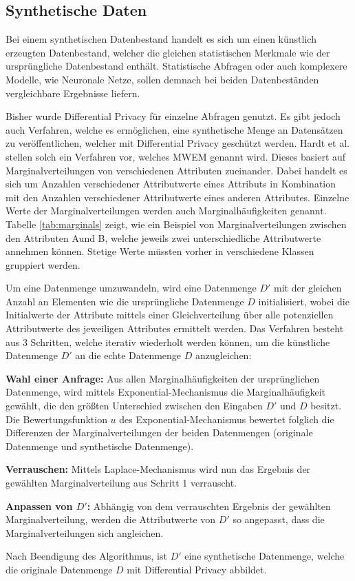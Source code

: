 \subsection{Synthetische Daten}\label{sec:synthetic_data}

Bei einem synthetischen Datenbestand handelt es sich um einen künstlich erzeugten Datenbestand, welcher die gleichen statistischen Merkmale wie der ursprüngliche Datenbestand enthält.
Statistische Abfragen oder auch komplexere Modelle, wie Neuronale Netze, sollen demnach bei beiden Datenbeständen vergleichbare Ergebnisse liefern.

Bisher wurde Differential Privacy für einzelne Abfragen genutzt.
Es gibt jedoch auch Verfahren, welche es ermöglichen, eine synthetische Menge an Datensätzen zu veröffentlichen, welcher mit Differential Privacy geschützt werden.
Hardt et al. \cite{P-90} stellen solch ein Verfahren vor, welches MWEM genannt wird.
Dieses basiert auf Marginalverteilungen von verschiedenen Attributen zueinander.
Dabei handelt es sich um Anzahlen verschiedener Attributwerte eines Attributs in Kombination mit den Anzahlen verschiedener Attributwerte eines anderen Attributes.
Einzelne Werte der Marginalverteilungen werden auch Marginalhäufigkeiten genannt.
Tabelle \ref{tab:marginals} zeigt, wie ein Beispiel von Marginalverteilungen zwischen den Attributen \dq A\dq und \dq B\dq, welche jeweils zwei unterschiedliche Attributwerte annehmen können.
Stetige Werte müssten vorher in verschiedene Klassen gruppiert werden.



Um eine Datenmenge umzuwandeln, wird eine Datenmenge $D'$ mit der gleichen Anzahl an Elementen wie die ursprüngliche Datenmenge $D$ initialisiert, wobei die Initialwerte der Attribute mittels einer Gleichverteilung über alle potenziellen Attributwerte des jeweiligen Attributes ermittelt werden.
Das Verfahren besteht aus 3 Schritten, welche iterativ wiederholt werden können, um die künstliche Datenmenge $D'$ an die echte Datenmenge $D$ anzugleichen:
\begin{compactenum}
    \item \textbf{Wahl einer Anfrage:} Aus allen Marginalhäufigkeiten der ursprünglichen Datenmenge, wird mittels Exponential-Mechanismus die Marginalhäufigkeit gewählt, die den größten Unterschied zwischen den Eingaben $D'$ und $D$ besitzt.
    Die Bewertungsfunktion $u$ des Exponential-Mechanismus bewertet folglich die Differenzen der Marginalverteilungen der beiden Datenmengen (originale Datenmenge und synthetische Datenmenge).
    \item \textbf{Verrauschen:} Mittels Laplace-Mechanismus wird nun das Ergebnis der gewählten Marginalverteilung aus Schritt 1 verrauscht.
    \item \textbf{Anpassen von $D'$:} Abhängig von dem verrauschten Ergebnis der gewählten Marginalverteilung, werden die Attributwerte von $D'$ so angepasst, dass die Marginalverteilungen sich angleichen.
\end{compactenum}
Nach Beendigung des Algorithmus, ist $D'$ eine synthetische Datenmenge, welche die originale Datenmenge $D$ mit Differential Privacy abbildet.

